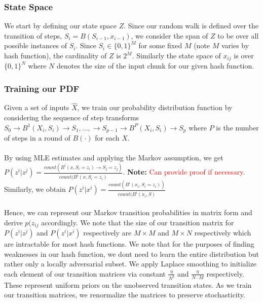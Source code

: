 \documentclass[letterpaper,twocolumn,10pt]{article}
\begin{document}
\subsubsection{State Space}
We start by defining our state space $Z$. Since our random walk is defined over the transition of steps, $S_{i} = B(S_{i-1}, x_{i-1})$, we consider the span of $Z$ to be over all possible instances of $S_{i}$. Since $S_{i} \in \{0, 1\}^{M}$ for some fixed $M$ (note $M$ varies by hash function), the cardinality of $Z$ is $2^{M}$. Similarly the state space of $x_{ij}$ is over $ \{0, 1\}^{N}$ where $N$ denotes the size of the input chunk for our given hash function.


\subsubsection{Training our PDF}
\label{MarkovProcess}
Given a set of inputs $\hat{X}$, we train our probability distribution function by considering the sequence of step transforms $S_{0} \rightarrow B^{1}(X_{i}, S_{i}) \rightarrow S_{1},..., \rightarrow S_{p-1} \rightarrow B^{P}(X_{i}, S_{i}) \rightarrow S_{p}$ where $P$ is the number of steps in a round of $B(\cdot)$ for each $X$. 
\\
\\
By using MLE estimates and applying the Markov assumption, we get $P(z^{i} | z^{j}) = \frac{count(B^{i}(x, S_{i} = z_{i}) \rightarrow S_{j} = z_{j})}{count(B^{i}(x, S_{i} = z_{i})}$. \textbf{Note:} \textcolor{red}{Can provide proof if necessary}. Similarly, we obtain $P(z^{i} | x^{i}) = \frac{count(B^{i}(x_{i}, S_{i} = z_{i}))}{count(B^{i}(x_{i}, S)}$
\\
\\
Hence, we can represent our Markov transition probabilities in matrix form and derive $p(z_{ij}$ accordingly. We note that the size of our transition matrix for $P(z^{i} | z^{j})$ and $P(z^{i} | x^{i})$ respectively are $M \times M$ and $M \times N$ respectively which are intractable for most hash functions. We note that for the purposes of finding weaknesses in our hash function, we dont need to learn the entire distribution but rather only a locally adversarial subset. We apply Laplace smoothing to initialize each element of our transition matrices via constant $\frac{\eta}{N^{2}}$ and $\frac{\eta}{N \cdot M}$ respectively. These represent uniform priors on the unobserved transition states. As we train our transition matrices, we renormalize the matrices to preserve stochasticity.
\end{document}

